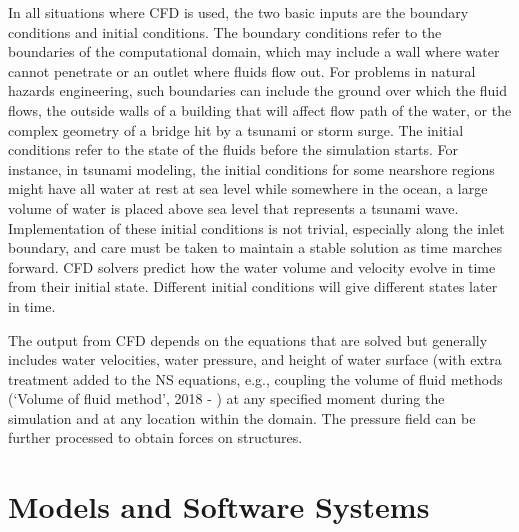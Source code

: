 In all situations where CFD is used, the two basic inputs are the boundary conditions and initial conditions. The boundary conditions refer to the boundaries of the computational domain, which may include a wall where water cannot penetrate or an outlet where fluids flow out. For problems in natural hazards engineering, such boundaries can include the ground over which the fluid flows, the outside walls of a building that will affect flow path of the water, or the complex geometry of a bridge hit by a tsunami or storm surge. The initial conditions refer to the state of the fluids before the simulation starts. For instance, in tsunami modeling, the initial conditions for some nearshore regions might have all water at rest at sea level while somewhere in the ocean, a large volume of water is placed above sea level that represents a tsunami wave. Implementation of these initial conditions is not trivial, especially along the inlet boundary, and care must be taken to maintain a stable solution as time marches forward.  CFD solvers predict how the water volume and velocity evolve in time from their initial state. Different initial conditions will give different states later in time.

The output from CFD depends on the equations that are solved but generally includes water velocities, water pressure, and height of water surface (with extra treatment added to the NS equations, e.g., coupling the volume of fluid methods (`Volume of fluid method', 2018 - \cite{Brackbill1992VOF, Hirt1981VOF, Jasak1996VOF, Ubbink1997VOF, Ubbink2002VOF}) at any specified moment during the simulation and at any location within the domain. The pressure field can be further processed to obtain forces on structures.

\section{Models and Software Systems}
\label{sec:resp_cfd_water_methods}

